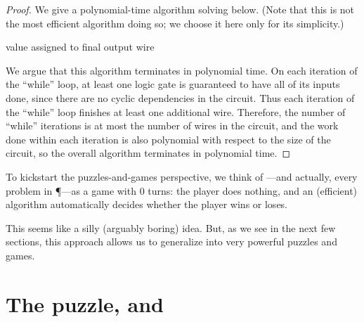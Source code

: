 \begin{proof}
  We give a polynomial-time algorithm solving  below.
  (Note that this is not the most efficient algorithm doing so; we choose it
  here only for its simplicity.)

  \begin{algorithm}{}{}
    \begin{algorithmic}
      \EndIf%
      \EndFor%
      \EndWhile%
      \State \Return value assigned to final output wire%
    \end{algorithmic}
  \end{algorithm}

  We argue that this algorithm terminates in polynomial time.  On each
  iteration of the ``while'' loop, at least one logic gate is guaranteed to
  have all of its inputs done, since there are no cyclic dependencies in the
  circuit.  Thus each iteration of the ``while'' loop finishes at least one
  additional wire.  Therefore, the number of ``while'' iterations is at most
  the number of wires in the circuit, and the work done within each iteration
  is also polynomial with respect to the size of the circuit, so the overall
  algorithm terminates in polynomial time.
\end{proof}

To kickstart the puzzles-and-games perspective, we think of ---and actually, every problem in \P---as a game with \(0\) turns: the
player does nothing, and an (efficient) algorithm automatically decides whether
the player wins or loses.

This seems like a silly (arguably boring) idea.  But, as we see in the next few
sections, this approach allows us to generalize  into
very powerful puzzles and games.

\section{The  puzzle, and \NP}

